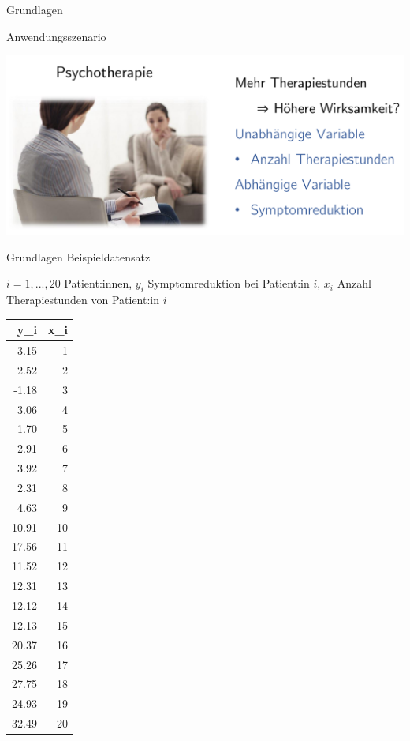 \documentclass[
  8pt,
  ignorenonframetext,
]{beamer}
\begin{document}
\begin{frame}{Grundlagen}
\protect\hypertarget{grundlagen}{}
\large

Anwendungsszenario \vspace{2mm}

\begin{center}\includegraphics[width=0.8\linewidth]{2_Abbildungen/alm_2_beispielszenario} \end{center}
\end{frame}

\begin{frame}{Grundlagen}
\protect\hypertarget{grundlagen-1}{}
Beispieldatensatz

\center
\footnotesize

\(i = 1,...,20\) Patient:innen, \(y_i\) Symptomreduktion bei Patient:in
\(i\), \(x_i\) Anzahl Therapiestunden von Patient:in \(i\)


\begin{longtable}[]{@{}rr@{}}
\toprule
y\_i & x\_i \\
\midrule
\endhead
-3.15 & 1 \\
2.52 & 2 \\
-1.18 & 3 \\
3.06 & 4 \\
1.70 & 5 \\
2.91 & 6 \\
3.92 & 7 \\
2.31 & 8 \\
4.63 & 9 \\
10.91 & 10 \\
17.56 & 11 \\
11.52 & 12 \\
12.31 & 13 \\
12.12 & 14 \\
12.13 & 15 \\
20.37 & 16 \\
25.26 & 17 \\
27.75 & 18 \\
24.93 & 19 \\
32.49 & 20 \\
\bottomrule
\end{longtable}
\end{frame}
\end{document}
